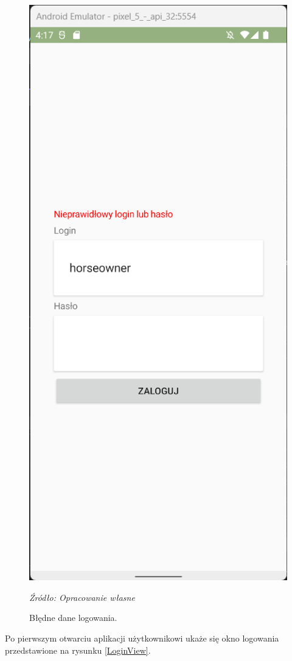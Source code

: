 \documentclass[12pt,twoside]{report}
\begin{document}
\begin{figure}
		\centering
	\includegraphics[scale=0.35]{WrongLoginData}
	\caption{\centering Błędne dane logowania.}
	\textit{\centering Źródło: Opracowanie własne}
	\label{LoginViewWrongPassword}
\end{figure}
Po pierwszym otwarciu aplikacji użytkownikowi ukaże się okno logowania przedstawione na rysunku \ref{LoginView}. 
\end{document}
